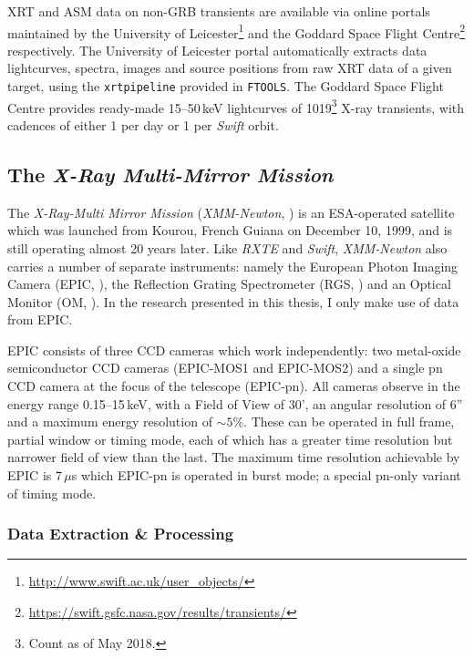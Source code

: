 \par XRT and ASM data on non-GRB transients are available via online portals maintained by the University of Leicester\footnote{\url{http://www.swift.ac.uk/user_objects/}} and the Goddard Space Flight Centre\footnote{\url{https://swift.gsfc.nasa.gov/results/transients/}} respectively.  The University of Leicester portal automatically extracts data lightcurves, spectra, images and source positions from raw XRT data of a given target, using the \texttt{xrtpipeline} provided in \texttt{FTOOLS}.  The Goddard Space Flight Centre provides ready-made 15--50\,keV lightcurves of 1019\footnote{Count as of May 2018.} X-ray transients, with cadences of either 1 per day or 1 per \textit{Swift} orbit.

\subsection{The \textit{X-Ray Multi-Mirror Mission}}

\par The \textit{X-Ray-Multi Mirror Mission} (\textit{XMM-Newton}, \citealp{Jansen_XMM}) is an ESA-operated satellite which was launched from Kourou, French Guiana on December 10, 1999, and is still operating almost 20 years later.  Like \textit{RXTE} and \textit{Swift}, \textit{XMM-Newton} also carries a number of separate instruments: namely the European Photon Imaging Camera (EPIC, \citealp{Bignami_EPIC}), the Reflection Grating Spectrometer (RGS, \citealp{denHerder_RGS}) and an Optical Monitor (OM, \citealp{Mason_OM}).  In the research presented in this thesis, I only make use of data from EPIC.
\par EPIC consists of three CCD cameras which work independently: two metal-oxide semiconductor CCD cameras (EPIC-MOS1 and EPIC-MOS2) and a single pn CCD camera at the focus of the telescope (EPIC-pn).  All cameras observe in the energy range 0.15--15\,keV, with a Field of View of 30', an angular resolution of 6'' and a maximum energy resolution of $\sim5$\%.  These can be operated in full frame, partial window or timing mode, each of which has a greater time resolution but narrower field of view than the last.  The maximum time resolution achievable by EPIC is 7\,$\mu$s which EPIC-pn is operated in burst mode; a special pn-only variant of timing mode.

\subsubsection{Data Extraction \& Processing}

